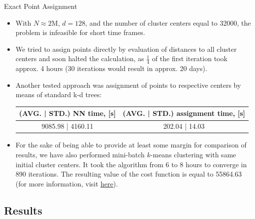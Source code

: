 \begin{frame}
	
	\begin{block}{Exact Point Assignment}
		
		\begin{itemize}
			\item With $N \approx 2$M, $d = 128$, and the number of cluster centers equal to 32000, the problem is infeasible for short time frames.
			
			\item We tried to assign points directly by evaluation of distances to all cluster centers and soon halted the calculation, as $\frac{1}{4}$ of the first iteration took approx. 4 hours (30 iterations would result in approx. 20 days).
			
			\item Another tested approach was assignment of points to respective centers by means of standard k-d trees:
			
			\begin{table}
				\scriptsize
				\begin{tabular}{| c | c |}
					\hline
					(AVG. | STD.) NN time, [s] & (AVG. | STD.) assignment time, [s] \\
					\hline
					\hline			
					9085.98 | 4160.11 & 202.04 | 14.03 \\
					\hline  
				\end{tabular}
			\end{table}
			
			\item For the sake of being able to provide at least some margin for comparison of results, we have also performed mini-batch $k$-means clustering \cite{Sculley2010} with same initial cluster centers. It took the algorithm from 6 to 8 hours to converge in 890 iterations. The resulting value of the cost function is equal to 55864.63 (for more information, visit \href{https://github.com/salisaresama/computer-vision/blob/flann-32k/_aux/kmeans_std.ipynb}{{\color{blue} \underline{here}}}).
		\end{itemize}
		
	\end{block}

\end{frame}


\subsection{Results}

